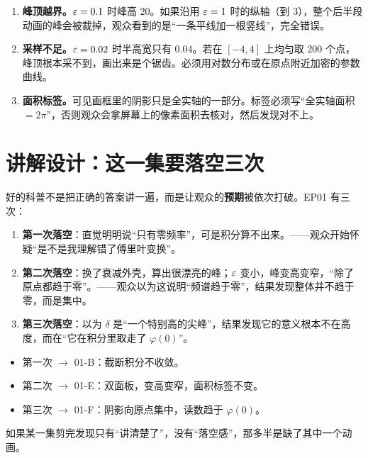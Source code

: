 \begin{warnbox}[三个纯技术但会毁掉一集的坑]
\begin{enumerate}[leftmargin=1.4em,itemsep=0.35em]
\item \textbf{峰顶越界。}$\varepsilon=0.1$ 时峰高 $20$。如果沿用 $\varepsilon=1$ 时的纵轴（到 $3$），整个后半段动画的峰会被裁掉，观众看到的是“一条平线加一根竖线”，完全错误。
\item \textbf{采样不足。}$\varepsilon=0.02$ 时半高宽只有 $0.04$。若在 $[-4,4]$ 上均匀取 $200$ 个点，峰顶根本采不到，画出来是个锯齿。必须用对数分布或在原点附近加密的参数曲线。
\item \textbf{面积标签。}可见画框里的阴影只是全实轴的一部分。标签必须写“全实轴面积 $=2\pi$”，否则观众会拿屏幕上的像素面积去核对，然后发现对不上。
\end{enumerate}
\end{warnbox}

\section{讲解设计：这一集要落空三次}

好的科普不是把正确的答案讲一遍，而是让观众的\textbf{预期}被依次打破。EP01 有三次：

\begin{enumerate}[leftmargin=2em,itemsep=0.6em]
\item \textbf{第一次落空}：直觉明明说“只有零频率”，可是积分算不出来。——观众开始怀疑“是不是我理解错了傅里叶变换”。
\item \textbf{第二次落空}：换了衰减外壳，算出很漂亮的峰；$\varepsilon$ 变小，峰变高变窄，“除了原点都趋于零”。——观众以为这说明“频谱趋于零”，结果发现整体并不趋于零，而是集中。
\item \textbf{第三次落空}：以为 $\delta$ 是“一个特别高的尖峰”，结果发现它的意义根本不在高度，而在“它在积分里取走了 $\varphi(0)$”。
\end{enumerate}

\begin{ideabox}[三次落空各自对应一个动画]
\begin{itemize}[leftmargin=1.4em,itemsep=0.2em]
\item 第一次 $\to$ 01-B：截断积分不收敛。
\item 第二次 $\to$ 01-E：双面板，变高变窄，面积标签不变。
\item 第三次 $\to$ 01-F：阴影向原点集中，读数趋于 $\varphi(0)$。
\end{itemize}
如果某一集剪完发现只有“讲清楚了”，没有“落空感”，那多半是缺了其中一个动画。
\end{ideabox}

